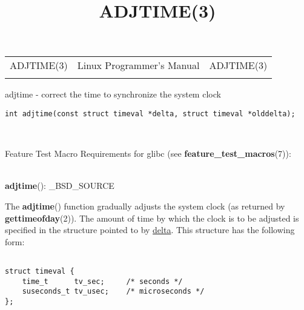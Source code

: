 \documentclass[]{article}
\title{ADJTIME(3)}
\author{}
\date{}
\let\realtextbf=\textbf
\renewcommand{\textbf}[1]{\textcolor{boldcolor}{\realtextbf{#1}}}
\renewcommand{\emph}[1]{\underline{#1}}
\begin{document}
\maketitle

\begin{longtable}[c]{@{}lll@{}}
\toprule\addlinespace
ADJTIME(3) & Linux Programmer's Manual & ADJTIME(3)
\\\addlinespace
\bottomrule
\end{longtable}


adjtime - correct the time to synchronize the system clock


\begin{verbatim}
int adjtime(const struct timeval *delta, struct timeval *olddelta);
\end{verbatim}

~

Feature Test Macro Requirements for glibc (see
\textbf{feature\_test\_macros}(7)): \\

~

\textbf{adjtime}(): \_BSD\_SOURCE


The \textbf{adjtime}() function gradually adjusts the system clock (as
returned by \textbf{gettimeofday}(2)). The amount of time by which the
clock is to be adjusted is specified in the structure pointed to by
\emph{delta}. This structure has the following form: \\

\begin{verbatim}

struct timeval {
    time_t      tv_sec;     /* seconds */
    suseconds_t tv_usec;    /* microseconds */
};
\end{verbatim}
\end{document}
